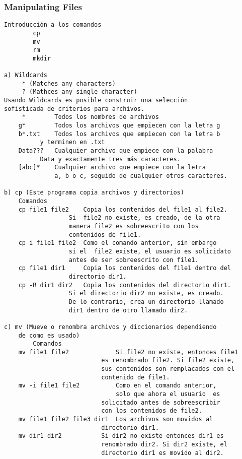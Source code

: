 \documentclass{article}
\begin{document}
\subsubsection{Manipulating Files}
\begin{verbatim}
Introducción a los comandos
		cp
		mv
		rm
		mkdir

a) Wildcards
	 * (Matches any characters)
	 ? (Mathces any single character)
Usando Wildcards es posible construir una selección
sofisticada de criterios para archivos.
	 *        Todos los nombres de archivos
	g*        Todos los archivos que empiecen con la letra g
	b*.txt    Todos los archivos que empiecen con la letra b 
          y terminen en .txt
	Data???   Cualquier archivo que empiece con la palabra 
          Data y exactamente tres más caracteres.
	[abc]*    Cualquier archivo que empiece con la letra
	          a, b o c, seguido de cualquier otros caracteres.

b) cp (Este programa copia archivos y directorios)
	Comandos
	cp file1 file2    Copia los contenidos del file1 al file2.
                  Si  file2 no existe, es creado, de la otra 
                  manera file2 es sobreescrito con los 
                  contenidos de file1.
	cp i file1 file2  Como el comando anterior, sin embargo 
                  si el  file2 existe, el usuario es solicidato 
                  antes de ser sobreescrito con file1.
	cp file1 dir1     Copia los contenidos del file1 dentro del 
                  directorio dir1.
	cp -R dir1 dir2   Copia los contenidos del directorio dir1.
                  Si el directorio dir2 no existe, es creado. 
                  De lo contrario, crea un directorio llamado 
                  dir1 dentro de otro llamado dir2.

c) mv (Mueve o renombra archivos y diccionarios dependiendo
	de como es usado)
	   	Comandos
	mv file1 file2             Si file2 no existe, entonces file1
                           es renombrado file2. Si file2 existe,
                           sus contenidos son remplacados con el 
                           contenido de file1.
	mv -i file1 file2          Como en el comando anterior,
	                           solo que ahora el usuario  es 
                           solicitado antes de sobreescribir 
                           con los contenidos de file2.
	mv file1 file2 file3 dir1  Los archivos son movidos al 
                           directorio dir1.
    mv dir1 dir2           Si dir2 no existe entonces dir1 es 
                           renombrado dir2. Si dir2 existe, el 
                           directorio dir1 es movido al dir2.


\end{verbatim}
\end{document}
